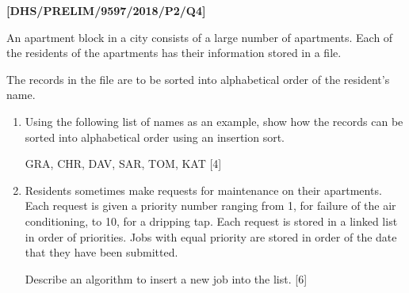 \item \textbf{{[}DHS/PRELIM/9597/2018/P2/Q4{]} }

An apartment block in a city consists of a large number of apartments.
Each of the residents of the apartments has their information stored
in a file. 

The records in the file are to be sorted into alphabetical order of
the resident\textquoteright s name.
\begin{enumerate}
\item Using the following list of names as an example, show how the records
can be sorted into alphabetical order using an insertion sort. 

GRA, CHR, DAV, SAR, TOM, KAT \hfill{}{[}4{]}
\item Residents sometimes make requests for maintenance on their apartments.
Each request is given a priority number ranging from 1, for failure
of the air conditioning, to 10, for a dripping tap. Each request is
stored in a linked list in order of priorities. Jobs with equal priority
are stored in order of the date that they have been submitted. 

Describe an algorithm to insert a new job into the list.\hfill{}
{[}6{]}
\end{enumerate}